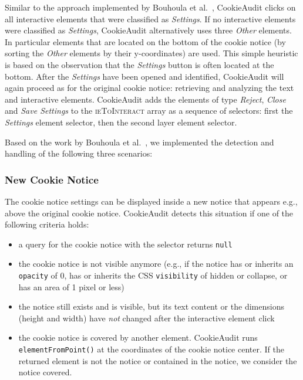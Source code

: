 Similar to the approach implemented by Bouhoula et al.~\cite{bouhoula2023automated}, CookieAudit clicks on all interactive elements that were classified as \emph{Settings}.
If no interactive elements were classified as \emph{Settings}, CookieAudit alternatively uses three \emph{Other} elements. 
In particular elements that are located on the bottom of the cookie notice (by sorting the \emph{Other} elements by their y-coordinates) are used.
This simple heuristic is based on the observation that the \emph{Settings} button is often located at the bottom.
After the \emph{Settings} have been opened and identified, CookieAudit will again proceed as for the original cookie notice: retrieving and analyzing the text and interactive elements.
CookieAudit adds the elements of type \emph{Reject}, \emph{Close} and \emph{Save Settings} to the \textsc{ieToInteract} array as a sequence of selectors: first the \emph{Settings} element selector, then the second layer element selector. 

Based on the work by Bouhoula et al.~\cite{bouhoula2023automated}, we implemented the detection and handling of the following three scenarios:

\subsubsection{New Cookie Notice}
The cookie notice settings can be displayed inside a new notice that appears e.g., above the original cookie notice. 
CookieAudit detects this situation if one of the following criteria holds:

\begin{itemize} 
    \item a query for the cookie notice with the selector returns \verb|null|
    \item the cookie notice is not visible anymore (e.g., if the notice has or inherits an \verb|opacity| of 0, has or inherits the CSS \verb|visibility| of hidden or collapse, or has an area of 1 pixel or less) 
    \item the notice still exists and is visible, but its text content or the dimensions (height and width) have \emph{not} changed after the interactive element click
    \item the cookie notice is covered by another element. CookieAudit runs \verb|elementFromPoint()| at the coordinates of the cookie notice center. If the returned element is not the notice or contained in the notice, we consider the notice covered.
\end{itemize}

